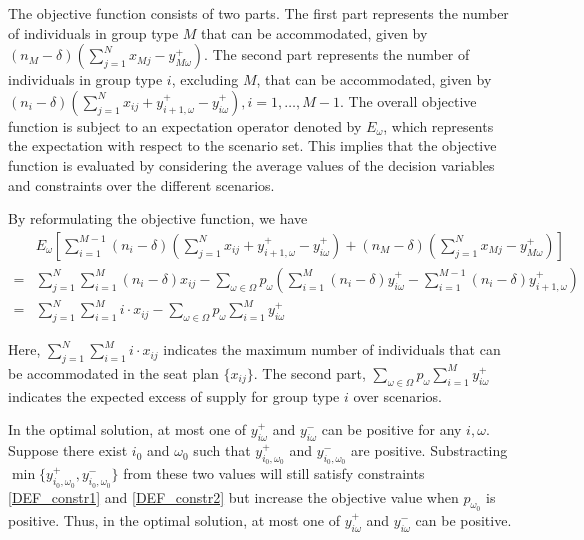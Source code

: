 
The objective function consists of two parts. The first part represents the number of individuals in
group type $M$ that can be accommodated, given by $(n_{M}-\delta) (\sum_{j=1}^{N} x_{Mj} - y_{M\omega}^{+})$. The second part represents the number of individuals in group type $i$, excluding $M$, that can be accommodated, given by $(n_i-\delta) (\sum_{j=1}^{N} x_{ij} + y_{i+1,\omega}^{+} - y_{i\omega}^{+}), i = 1, \ldots, M-1$. The overall objective function is subject to an expectation operator denoted by $E_{\omega}$, which represents the expectation with respect to the scenario set. This implies that the objective function is evaluated by considering the average values of the decision variables and constraints over the different scenarios.

By reformulating the objective function, we have
\begin{align*}
  & E_{\omega}\left[\sum_{i=1}^{M-1} (n_i-\delta) (\sum_{j= 1}^{N} x_{ij} + y_{i+1,\omega}^{+} - y_{i \omega}^{+}) + (n_M-\delta) (\sum_{j= 1}^{N} x_{Mj} - y_{M \omega}^{+})\right] \\
  = & \sum_{j =1}^{N} \sum_{i=1}^M (n_i- \delta) x_{ij} - \sum_{\omega \in \Omega} p_{\omega} \left(\sum_{i=1}^{M}(n_i- \delta)y_{i \omega}^{+} - \sum_{i=1}^{M-1}(n_i-\delta)y_{i+1, \omega}^{+}\right) \\
  = & \sum_{j =1}^{N} \sum_{i=1}^M i \cdot x_{ij} - \sum_{\omega \in \Omega} p_{\omega} \sum_{i = 1}^{M} y_{i \omega}^{+}
\end{align*}

Here, $\sum_{j =1}^{N} \sum_{i=1}^M i \cdot x_{ij}$ indicates the maximum number of individuals that can be accommodated in the seat plan $\{x_{ij}\}$. The second part, $\sum_{\omega \in \Omega} p_{\omega} \sum_{i = 1}^{M} y_{i \omega}^{+}$ indicates the expected excess of supply for group type $i$ over scenarios.

In the optimal solution, at most one of $y_{i \omega}^{+}$ and $y_{i \omega}^{-}$ can be positive for any $i, \omega$. Suppose there exist $i_0$ and $\omega_0$ such that $y_{i_0, \omega_0}^{+}$ and $y_{i_0, \omega_0}^{-}$ are positive. Substracting $\min\{y_{i_0, \omega_0}^{+}, y_{i_0, \omega_0}^{-}\}$ from these two values will still satisfy constraints \eqref{DEF_constr1} and \eqref{DEF_constr2} but increase the objective value when $p_{\omega_0}$ is positive. Thus, in the optimal solution, at most one of $y_{i \omega}^{+}$ and $y_{i \omega}^{-}$ can be positive.

